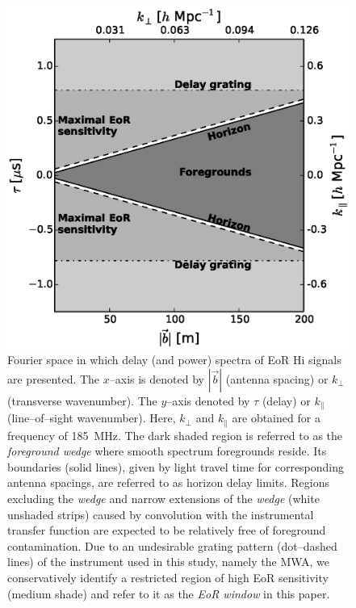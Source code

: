 \documentclass[preprint2,iop,numberedappendix]{emulateapj}
\begin{document}
\begin{figure}[htb]
\centering
\includegraphics[width=\linewidth]{figures/v1_0/fourier_space_185.0_MHz_30.7_MHz.eps}
\caption{Fourier space in which delay (and power) spectra of EoR H{\sc i} signals are presented. The $x$--axis is denoted by $|\vec{b}|$ (antenna spacing) or $k_\perp$ (transverse wavenumber). The $y$--axis denoted by $\tau$ (delay) or $k_\parallel$ (line--of--sight wavenumber). Here, $k_\perp$ and $k_\parallel$ are obtained for a frequency of 185~MHz. The dark shaded region is referred to as the {\it foreground wedge} where smooth spectrum foregrounds reside. Its boundaries (solid lines), given by light travel time for corresponding antenna spacings, are referred to as horizon delay limits. Regions excluding the {\it wedge} and narrow extensions of the {\it wedge} (white unshaded strips) caused by convolution with the instrumental transfer function are expected to be relatively free of foreground contamination. Due to an undesirable grating pattern (dot--dashed lines) of the instrument used in this study, namely the MWA, we conservatively identify a restricted region of high EoR sensitivity (medium shade) and refer to it as the {\it EoR window} in this paper. \label{fig:fourier-space}}
\end{figure}

\end{document}
